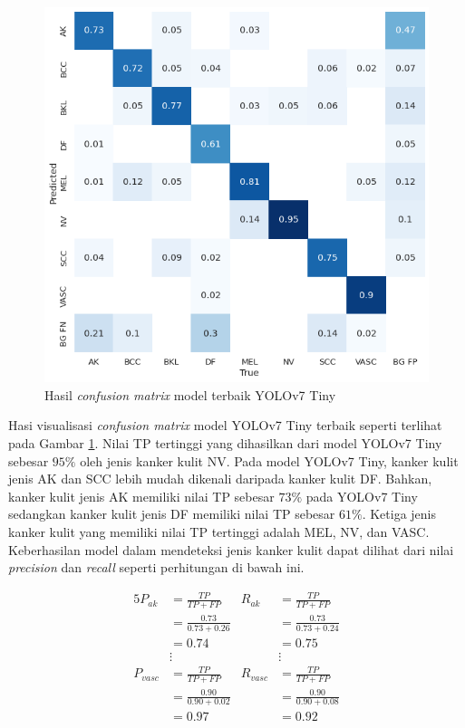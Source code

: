 \begin{figure}[H]
    \begin{center}
        \includegraphics[width=12cm]{img/bab4/confmat-yolov7tiny.png}
        \caption{Hasil \textit{confusion matrix} model terbaik YOLOv7 Tiny}
        \label{fig:d-confmat-yolov7tiny}
    \end{center}
\end{figure}

Hasi visualisasi \textit{confusion matrix} model YOLOv7 Tiny terbaik seperti terlihat pada Gambar \ref{fig:d-confmat-yolov7tiny}. Nilai TP tertinggi yang dihasilkan dari model YOLOv7 Tiny sebesar $95\%$ oleh jenis kanker kulit NV. Pada model YOLOv7 Tiny, kanker kulit jenis AK dan SCC lebih mudah dikenali daripada kanker kulit DF. Bahkan, kanker kulit jenis AK memiliki nilai TP sebesar $73\%$ pada YOLOv7 Tiny sedangkan kanker kulit jenis DF memiliki nilai TP sebesar $61\%$. Ketiga jenis kanker kulit yang memiliki nilai TP tertinggi adalah MEL, NV, dan VASC. Keberhasilan model dalam mendeteksi jenis kanker kulit dapat dilihat dari nilai \textit{precision} dan \textit{recall} seperti perhitungan di bawah ini.

\begin{alignat*}{5}
    P_{ak}   &= \frac{TP}{TP+FP}         & R_{ak}   &= \frac{TP}{TP+FP} \\
             &= \frac{0.73}{0.73 + 0.26} &          &= \frac{0.73}{0.73 + 0.24} \\
             &= 0.74                     &          &= 0.75 \\
             &\vdots                     &          &\vdots \\
    P_{vasc} &= \frac{TP}{TP+FP}         & R_{vasc} &= \frac{TP}{TP+FP} \\
             &= \frac{0.90}{0.90 + 0.02} &          &= \frac{0.90}{0.90 + 0.08} \\
             &= 0.97                     &          &= 0.92 \\
\end{alignat*}

